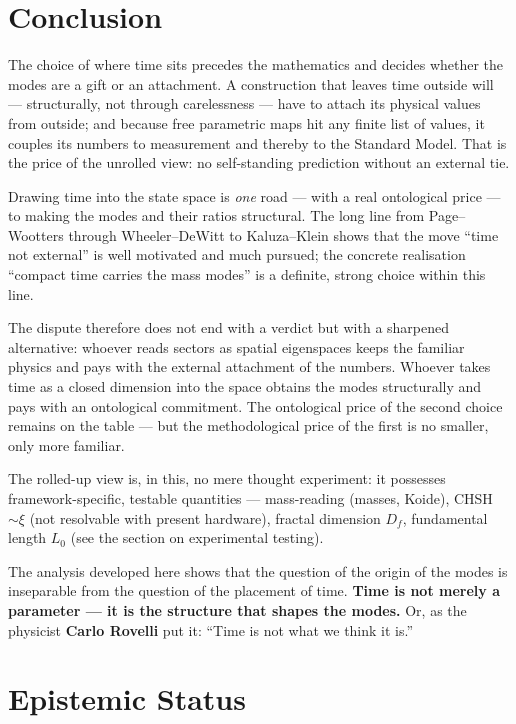 \section{Conclusion}

The choice of where time sits precedes the mathematics and decides whether the modes are a gift or an attachment. A construction that leaves time outside will --- structurally, not through carelessness --- have to attach its physical values from outside; and because free parametric maps hit any finite list of values, it couples its numbers to measurement and thereby to the Standard Model. That is the price of the unrolled view: no self-standing prediction without an external tie.

Drawing time into the state space is \emph{one} road --- with a real ontological price --- to making the modes and their ratios structural. The long line from Page--Wootters through Wheeler--DeWitt to Kaluza--Klein shows that the move ``time not external'' is well motivated and much pursued; the concrete realisation ``compact time carries the mass modes'' is a definite, strong choice within this line.

The dispute therefore does not end with a verdict but with a sharpened alternative: whoever reads sectors as spatial eigenspaces keeps the familiar physics and pays with the external attachment of the numbers. Whoever takes time as a closed dimension into the space obtains the modes structurally and pays with an ontological commitment. The ontological price of the second choice remains on the table --- but the methodological price of the first is no smaller, only more familiar.

The rolled-up view is, in this, no mere thought experiment: it possesses framework-specific, testable quantities --- mass-reading (masses, Koide), CHSH~$\sim\xi$ (not resolvable with present hardware), fractal dimension $D_f$, fundamental length $L_0$ (see the section on experimental testing).

The analysis developed here shows that the question of the origin of the modes is inseparable from the question of the placement of time. \textbf{Time is not merely a parameter --- it is the structure that shapes the modes.} Or, as the physicist \textbf{Carlo Rovelli} put it: ``Time is not what we think it is.''


\section{Epistemic Status}

